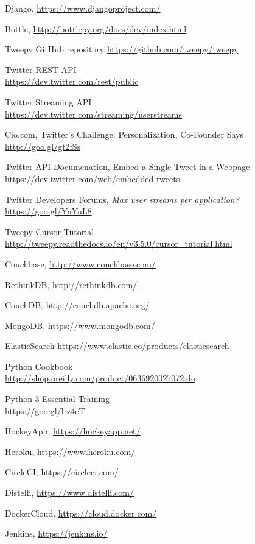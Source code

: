 \documentclass{article}
\begin{document}
\begin{thebibliography}{9}
    Django, \url{https://www.djangoproject.com/}
    
    Bottle, \url{http://bottlepy.org/docs/dev/index.html}
    
    Tweepy GitHub repository \url{https://github.com/tweepy/tweepy}

    Twitter REST API \\
    \phantom{ } \url{https://dev.twitter.com/rest/public}

    Twitter Streaming API \\ 
    \phantom{ } \url{https://dev.twitter.com/streaming/userstreams}
    
    Cio.com, Twitter's Challenge: Personalization, Co-Founder Says \\
    \phantom{ } \url{http://goo.gl/gt2fSs}

    Twitter API Documenation, Embed a Single Tweet in a Webpage \\
    \phantom{ } \url{https://dev.twitter.com/web/embedded-tweets}
    
    Twitter Developers Forums, \textit{Max user streams per application?} \\
    \phantom{ } \url{https://goo.gl/YnYuL8}
    
    Tweepy Cursor Tutorial \\ 
    \phantom{ } \url{http://tweepy.readthedocs.io/en/v3.5.0/cursor_tutorial.html}

    Couchbase, \url{http://www.couchbase.com/}
    
    RethinkDB, \url{http://rethinkdb.com/}

    CouchDB, \url{http://couchdb.apache.org/}

    MongoDB, \url{https://www.mongodb.com/}

    ElasticSearch \url{https://www.elastic.co/products/elasticsearch}
    
    Python Cookbook \\
    \phantom{ } \url{http://shop.oreilly.com/product/0636920027072.do}
    
    Python 3 Essential Training \\
    \phantom{ } \url{https://goo.gl/lrz4eT}
    
    HockeyApp, \url{https://hockeyapp.net/}
    
    Heroku, \url{https://www.heroku.com/}
    
    CircleCI, \url{https://circleci.com/}
    
    Distelli, \url{https://www.distelli.com/}
    
    DockerCloud, \url{https://cloud.docker.com/}
    
    Jenkins, \url{https://jenkins.io/}


\end{thebibliography}


\newpage
\end{document}
